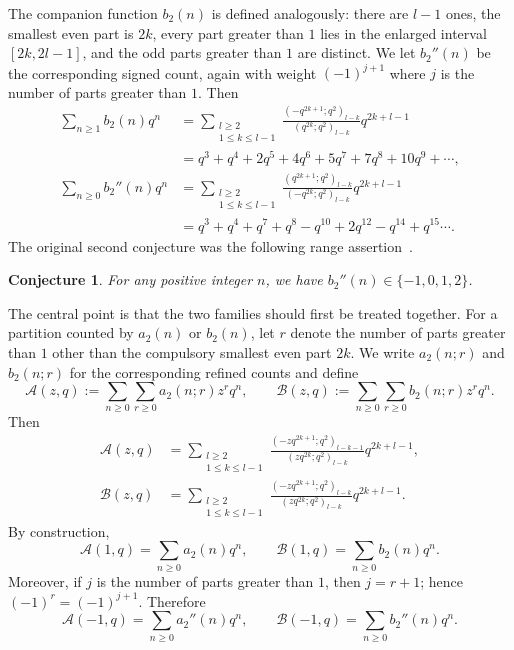 \documentclass[10pt,a4paper]{amsart}
\newtheorem{conjecture} {Conjecture}
\numberwithin{equation}{section}
\newcommand{\fr}{\frac}
\begin{document}
The companion function $b_2(n)$ is defined analogously: there are $l-1$ ones, the smallest even part is $2k$, every part greater than $1$ lies in the enlarged interval $[2k,2l-1]$, and the odd parts greater than $1$ are distinct. We let $b_2''(n)$ be the corresponding signed count, again with weight $(-1)^{j+1}$ where $j$ is the number of parts greater than $1$. Then
\begin{align*}
\sum_{n\geq 1} b_2(n) q^n &= \sum_{\substack{l\geq 2\\1\leq k\leq l-1}}\fr{(-q^{2k+1};q^2)_{l-k}}{(q^{2k};q^2)_{l-k}}q^{2k+l-1}\\
&=q^3 + q^4 + 2 q^5 + 4 q^6 + 5 q^7 + 7 q^8 + 10 q^9 +\cdots, \\
\sum_{n\geq 0} b_2''(n) q^n &= \sum_{\substack{l\geq 2 \\1\leq k \leq l-1}}\fr{(q^{2k+1};q^2)_{l-k}}{(-q^{2k};q^2)_{l-k}}q^{2k+l-1} \\
&= q^3 + q^4 + q^7 + q^8 - q^{10} + 2 q^{12} - q^{14} + q^{15} \cdots.
\end{align*}
The original second conjecture was the following range assertion~\cite[Conjecture 2]{Andrews-Bachraoui conjectures}.
\begin{conjecture}\label{conj2}
For any positive integer $n$, we have $b_2''(n)\in\{-1,0,1,2\}$.
\end{conjecture}

The central point is that the two families should first be treated together. For a partition counted by $a_2(n)$ or $b_2(n)$, let $r$ denote the number of parts greater than $1$ other than the compulsory smallest even part $2k$. We write $a_2(n;r)$ and $b_2(n;r)$ for the corresponding refined counts and define
\[
\mathcal A(z,q):=\sum_{n\ge 0}\sum_{r\ge 0} a_2(n;r)z^r q^n,\qquad
\mathcal B(z,q):=\sum_{n\ge 0}\sum_{r\ge 0} b_2(n;r)z^r q^n.
\]
Then
\begin{align}
\mathcal A(z,q)
&=\sum_{\substack{l\ge 2\\1\le k\le l-1}}
\frac{(-zq^{2k+1};q^2)_{l-k-1}}{(zq^{2k};q^2)_{l-k}}q^{2k+l-1}, \label{eq zA-def}\\
\mathcal B(z,q)
&=\sum_{\substack{l\ge 2\\1\le k\le l-1}}
\frac{(-zq^{2k+1};q^2)_{l-k}}{(zq^{2k};q^2)_{l-k}}q^{2k+l-1}. \label{eq zB-def}
\end{align}
By construction,
\[
\mathcal A(1,q)=\sum_{n\ge 0} a_2(n)q^n,\qquad \mathcal B(1,q)=\sum_{n\ge 0} b_2(n)q^n.
\]
Moreover, if $j$ is the number of parts greater than $1$, then $j=r+1$; hence $(-1)^r=(-1)^{j+1}$. Therefore
\[
\mathcal A(-1,q)=\sum_{n\ge 0} a_2''(n)q^n,\qquad
\mathcal B(-1,q)=\sum_{n\ge 0} b_2''(n)q^n.
\]
\end{document}
